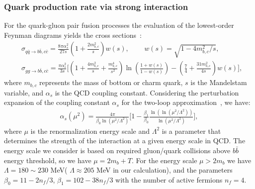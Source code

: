 \subsubsection{Quark production rate via strong interaction}
For the quark-gluon pair fusion processes
the evaluation of the lowest-order Feynman diagrams yields the cross sections~\cite{Letessier:2002ony}:
\begin{align}
&\sigma_{q\bar{q}\rightarrow b\bar{b},c\bar{c}}=\frac{8\pi\alpha_s^2}{27s}\left(1+\frac{2m_{b,c}^2}{s}\right)w(s),\,\qquad w(s)=\sqrt{1-{4m^2_{b,c}}/{s}},\\
&\sigma_{gg\rightarrow b\bar{b},c\bar{c}}=\!\frac{\pi\alpha_s^2}{3s}\bigg[\left(1\!+\!\frac{4m^2_{b,c}}{s}\!+\!\frac{m^4_{b,c}}{s^2}\right)\ln{\left(\frac{1+w(s)}{1-w(s)}\right)}\!-\!\left(\frac{7}{4}\!+\!\frac{31m^2_{b,c}}{4s}\right)w(s)\bigg],
\end{align} 
where $m_{b,c}$ represents the mass of bottom or charm quark, $s$ is the Mandelstam variable, and $\alpha_s$ is the QCD coupling constant. Considering the perturbation expansion of the coupling constant $\alpha_s$ for the two-loop approximation~\cite{Letessier:2002ony}, we have:
\begin{align}
\alpha_s(\mu^2)=\frac{4\pi}{\beta_0\ln({\mu^2/\Lambda^2})}\bigg[1-\frac{\beta_1}{\beta_0}\frac{\ln(\ln{(\mu^2/\Lambda^2)})}{\ln(\mu^2/\Lambda^2)}\bigg],
\end{align}
where $\mu$ is the renormalization energy scale and $\Lambda^2$ is a parameter that determines the strength of the interaction at a given energy scale in QCD. The energy scale we consider is based on required gluon/quark collisions above $b\bar b$ energy threshold, so we have $\mu=2m_b+T$. For the energy scale $\mu>2m_b$ we have $\Lambda=180\sim230$ MeV( $\Lambda\approx205$ MeV in our calculation), and the parameters $\beta_0=11-2n_f/3$, $\beta_1=102-38n_f/3$ with the number of active fermions $n_f=4$. 

